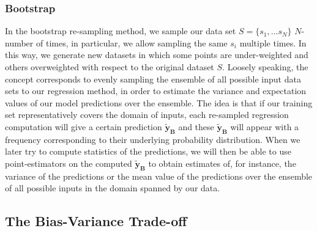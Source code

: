 \documentclass[reprint, english, nofootinbib]{revtex4-2}
\begin{document}
        \subsubsection{Bootstrap}
            \noindent
            In the bootstrap re-sampling method, we sample our data set $S = \{s_1, \dots s_N\}$ $N$-number of times, in particular, we allow sampling the same $s_i$ multiple times. In this way, we generate new datasets in which some points are under-weighted and others overweighted with respect to the original dataset $S$. Loosely speaking, the concept corresponds to evenly sampling the ensemble of all possible input data sets to our regression method, in order to estimate the variance and expectation values of our model predictions over the ensemble. The idea is that if our training set representatively covers the domain of inputs, each re-sampled regression computation will give a certain prediction $\pmb{\tilde{y}_{B}}$ and these $\pmb{\tilde{y}_{B}}$ will appear with a frequency corresponding to their  underlying probability distribution. When we later try to compute statistics of the predictions, we will then be able to use point-estimators on the computed $\pmb{\tilde{y}_{B}}$ to obtain estimates of, for instance, the variance of the predictions or the mean value of the predictions over the ensemble of all possible inputs in the domain spanned by our data.

    \subsection{The Bias-Variance Trade-off}
\end{document}
